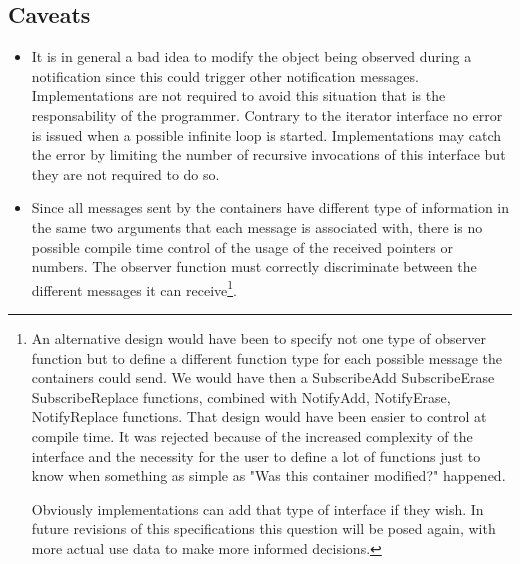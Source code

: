 \documentclass[12pt,a4paper]{memoir} %
\begin{document}
\subsection{Caveats}
\begin{itemize}
\item
It is in general a bad idea to modify the object being observed during a notification since this could trigger other notification
messages. Implementations are not required to avoid this situation that is the responsability of the programmer. Contrary to the iterator interface
no error is issued when a possible infinite loop is started. Implementations may catch the error by limiting the number of recursive
invocations of this interface but they are not required to do so.
\item
Since all messages sent by the containers have different type of information in the same two arguments that each message is associated with,
there is no possible compile time control of the usage of the received pointers or numbers. The observer function must correctly 
discriminate between the different messages it can receive\footnote{An alternative design would have been to specify not one type of
observer function but to define a different function type for each possible message the containers could send. We would have then a SubscribeAdd
SubscribeErase SubscribeReplace functions, combined with NotifyAdd, NotifyErase, NotifyReplace functions. That design would have been easier to
control at compile time. It was rejected because of the increased complexity of the interface and the necessity for the user to define a lot
of functions just to know when something as simple as "Was this container modified?" happened.

Obviously implementations can add that type of interface if they wish. In future revisions of this specifications this question will be posed again, with more actual use data to make more informed decisions.}.
\end{itemize}
\end{document}
